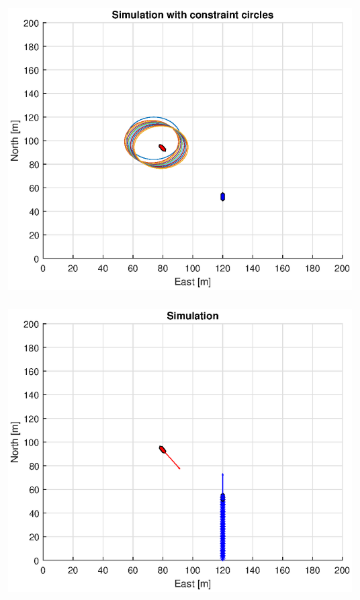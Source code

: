\begin{figure}[!b]
\begin{subfigure}[b]{0.499\textwidth}
    \end{subfigure}
    \hfill
    \\
    \begin{subfigure}[b]{0.49\textwidth}
        \centering
        \includegraphics[width=\textwidth]{Images/Figures/sving_SO/Simple0_f1_Frame3}
    \end{subfigure}
    \hfill
    \begin{subfigure}[b]{0.499\textwidth}
        \centering
        \includegraphics[width=\textwidth]{Images/Figures/sving_SO/Simple0_f600_Frame3}
    \end{subfigure}
    \hfill
\end{figure}%

